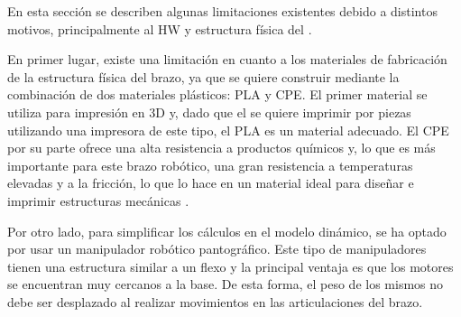 En esta sección se describen algunas limitaciones existentes debido a distintos motivos, principalmente al \ac{HW} y estructura física del \pArm{}.

En primer lugar, existe una limitación en cuanto a los materiales de fabricación de la estructura física del brazo, ya que se quiere construir mediante la combinación de dos materiales plásticos: \ac{PLA} y \ac{CPE}. El primer material se utiliza para impresión en 3D y, dado que el \pArm{} se quiere imprimir por piezas utilizando una impresora de este tipo, el \ac{PLA} es un material adecuado.
El \ac{CPE} por su parte ofrece una alta resistencia a productos químicos y, lo que es
más importante para este brazo robótico, una gran resistencia a temperaturas elevadas
y a la fricción, lo que lo hace en un material ideal para diseñar e imprimir estructuras
mecánicas \cite{ultimakerCPEFamilyUltimaker}.

Por otro lado, para simplificar los cálculos en el modelo dinámico, se ha optado por usar un manipulador robótico pantográfico. Este tipo de manipuladores tienen una estructura similar a un flexo y la principal ventaja es que los motores se encuentran muy cercanos a la base. De esta forma, el peso de los mismos no debe ser desplazado al realizar movimientos en las articulaciones del brazo.
